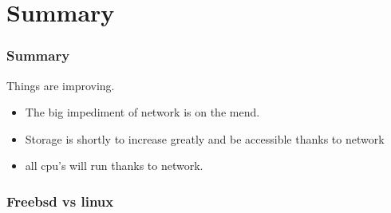 \documentclass{beamer}
\begin{document}
\section{Summary}
\begin{frame}
    \frametitle{Summary}
    Things are improving.
    \begin{itemize}
            \item The big impediment of network is on the mend.
                \item Storage is shortly to increase greatly and be accessible thanks to network
                    \item all cpu's will run thanks to network.
    \end{itemize}
   \end{frame}
   \begin{frame}
       \frametitle{Freebsd vs linux}
   \end{frame}
\end{document}
